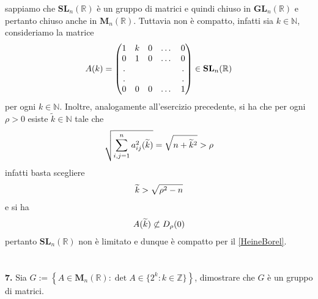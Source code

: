 \documentclass[oneside, 11pt]{amsbook}
\makeatletter
\newcommand{\0}{{(0)}}
\newcommand{\3}{{(3)}}
\theoremstyle{colonplain}
\theoremstyle{colondefinition}
\theoremstyle{colonremark}
\numberwithin{equation}{chapter}
\renewcommand{\proofname}{Dimostrazione}
\renewenvironment{proof}[1][\proofname]{\par
  \pushQED{\qed}%
  \normalfont \topsep6\p@\@plus6\p@\relax
  \trivlist
  \item[\hskip\labelsep\bfseries #1:]\ignorespaces
}{%
  \popQED\endtrivlist\@endpefalse
}
\makeatother
\begin{document}
\begin{proof} sappiamo che $\mathbf{SL}_n(\mathbb{R})$ è un gruppo di matrici e quindi chiuso in $\mathbf{GL}_n(\mathbb{R})$ e pertanto chiuso anche in $\mathbf{M}_n(\mathbb{R})$. Tuttavia non è compatto, infatti sia $k \in \mathbb{N}$, consideriamo la matrice
\begin{align} A(k) =
    \begin{pmatrix}
        1 & k & 0 & \dots & 0 \\
        0 & 1 & 0 & \dots & 0 \\
        . & & & & . \\
        . & & & & . \\
        0 & 0 & 0 & \dots & 1
    \end{pmatrix} \in \mathbf{SL}_n(\mathbb{R}) \notag
\end{align}
per ogni $k \in \mathbb{N}$. Inoltre, analogamente all'esercizio precedente, si ha che per ogni $\rho > 0$ esiste $\widetilde{k} \in \mathbb{N}$ tale che
\begin{align}
    \sqrt{\sum_{i, j = 1}^n a^2_{ij}(\widetilde{k})} = \sqrt{n + \widetilde{k}^2} > \rho \notag
\end{align}
infatti basta scegliere
\begin{align}
    \widetilde{k} > \sqrt{\rho^2 - n} \notag
\end{align}
e si ha
\begin{align}
    A(\widetilde{k}) \not\subset D_\rho(0) \notag
\end{align}
pertanto $\mathbf{SL}_n(\mathbb{R})$ non è limitato e dunque è compatto per il \cref{HeineBorel}. \\ \\ \\
\end{proof}
\textbf{7.} Sia $G := \left\{ A \in \mathbf{M}_n(\mathbb{R}) : \det A \in \{ 2^k : k \in \mathbb{Z} \} \right\}$, dimostrare che $G$ è un gruppo di matrici. \\
\end{document}
